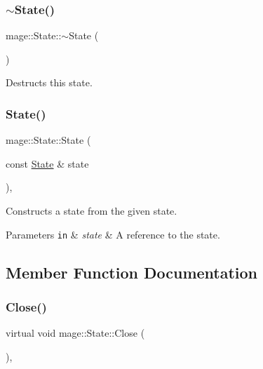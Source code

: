 \subsubsection{\texorpdfstring{$\sim$\+State()}{~State()}}
{\footnotesize\ttfamily mage\+::\+State\+::$\sim$\+State (\begin{DoxyParamCaption}{ }\end{DoxyParamCaption})\hspace{0.3cm}{\ttfamily [default]}}

Destructs this state. \hypertarget{classmage_1_1_state_a4515dcef9830ce6522ea6036465dcff7}{}\label{classmage_1_1_state_a4515dcef9830ce6522ea6036465dcff7} 
\subsubsection{\texorpdfstring{State()}{State()}\hspace{0.1cm}{\footnotesize\ttfamily [2/2]}}
{\footnotesize\ttfamily mage\+::\+State\+::\+State (\begin{DoxyParamCaption}\item[{const \hyperlink{classmage_1_1_state}{State} \&}]{state }\end{DoxyParamCaption})\hspace{0.3cm}{\ttfamily [private]}, {\ttfamily [delete]}}

Constructs a state from the given state.


\begin{DoxyParams}[1]{Parameters}
\mbox{\tt in}  & {\em state} & A reference to the state. \\
\hline
\end{DoxyParams}


\subsection{Member Function Documentation}
\hypertarget{classmage_1_1_state_a1edd5d756566f5b689c7a381f4e6b301}{}\label{classmage_1_1_state_a1edd5d756566f5b689c7a381f4e6b301} 
\subsubsection{\texorpdfstring{Close()}{Close()}}
{\footnotesize\ttfamily virtual void mage\+::\+State\+::\+Close (\begin{DoxyParamCaption}{ }\end{DoxyParamCaption})\hspace{0.3cm}{\ttfamily [protected]}, {\ttfamily [virtual]}}

